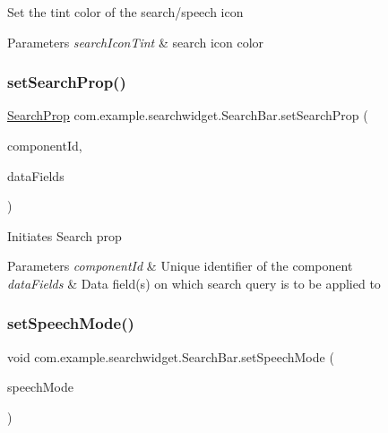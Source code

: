 Set the tint color of the search/speech icon


\begin{DoxyParams}{Parameters}
{\em search\+Icon\+Tint} & search icon color \\
\hline
\end{DoxyParams}
\mbox{\label{classcom_1_1example_1_1searchwidget_1_1_search_bar_a4adb569b19b3f944775531927ab378cf}} 
\subsubsection{\texorpdfstring{setSearchProp()}{setSearchProp()}}
{\footnotesize\ttfamily \mbox{\hyperlink{classcom_1_1example_1_1searchwidget_1_1_builder_1_1_search_prop}{Search\+Prop}} com.\+example.\+searchwidget.\+Search\+Bar.\+set\+Search\+Prop (\begin{DoxyParamCaption}\item[{String}]{component\+Id,  }\item[{Array\+List$<$ String $>$}]{data\+Fields }\end{DoxyParamCaption})}

Initiates Search prop


\begin{DoxyParams}{Parameters}
{\em component\+Id} & Unique identifier of the component \\
\hline
{\em data\+Fields} & Data field(s) on which search query is to be applied to \\
\hline
\end{DoxyParams}
\mbox{\label{classcom_1_1example_1_1searchwidget_1_1_search_bar_abcb40436e4d424c4f5ac721d5f507412}} 
\subsubsection{\texorpdfstring{setSpeechMode()}{setSpeechMode()}}
{\footnotesize\ttfamily void com.\+example.\+searchwidget.\+Search\+Bar.\+set\+Speech\+Mode (\begin{DoxyParamCaption}\item[{boolean}]{speech\+Mode }\end{DoxyParamCaption})}

